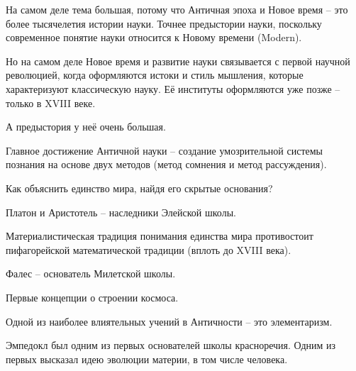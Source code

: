 \documentclass[main.tex]{subfiles}
\begin{document}


На самом деле тема большая, потому что Античная эпоха и Новое время -- это более тысячелетия истории науки.
Точнее предыстории науки, поскольку современное понятие науки относится к Новому времени (Modern).

Но на самом деле Новое время и развитие науки связывается с первой научной революцией, когда оформляются истоки и стиль мышления, которые характеризуют классическую науку.
Её институты оформляются уже позже -- только в XVIII веке.

А предыстория у неё очень большая.





Главное достижение Античной науки -- создание умозрительной системы познания на основе двух методов (метод сомнения и метод рассуждения).



Как объяснить единство мира, найдя его скрытые основания?

Платон и Аристотель -- наследники Элейской школы.

Материалистическая традиция понимания единства мира противостоит пифагорейской математической традиции (вплоть до XVIII века).

Фалес -- основатель Милетской школы.





Первые концепции о строении космоса.

Одной из наиболее влиятельных учений в Античности -- это элементаризм.

Эмпедокл был одним из первых основателей школы красноречия.
Одним из первых высказал идею эволюции материи, в том числе человека.
\end{document}
